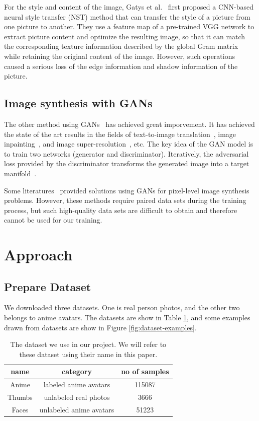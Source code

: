 \documentclass[10pt,twocolumn,letterpaper]{article}
\begin{document}
For the style and content of the image, Gatys et al.~\cite{NST} first proposed a
CNN-based neural style transfer (NST) method that can transfer the style of a
picture from one picture to another. They use a feature map of a pre-trained VGG
network to extract picture content and optimize the resulting image, so that it
can match the corresponding texture information described by the global Gram
matrix~\cite{gatys2015texture} while retaining the original content of the
image. However, such operations caused a serious loss of the edge information
and shadow information of the picture.

\subsection{Image synthesis with GANs}
The other method using GANs~\cite{GAN} has achieved great imporvement.
It has achieved the state of the art results in the fields of text-to-image
translation~\cite{reed2016generative}, image inpainting~\cite{yeh2016semantic},
and image super-resolution~\cite{ledig2017photo}, etc. The key idea of the GAN
model is to train two networks (generator and discriminator). Iteratively, the
adversarial loss provided by the discriminator transforms the generated image
into a target manifold~\cite{yeh2016semantic}.

Some literatures~\cite{dumoulin2016adversarially,isola2017image,
karacan2016learning} provided solutions using GANs for pixel-level image
synthesis problems. However, these methods require paired data sets during the
training process, but such high-quality data sets are difficult to obtain and
therefore cannot be used for our training.

\section{Approach}

\subsection{Prepare Dataset}

We downloaded three datasets. One is real person photos, and the other two
belongs to anime avatars. The datasets are show in Table \ref{tab:datasets}, and
some examples drawn from datasets are show in Figure \ref{fig:dataset-examples}.

\begin{table}[h]
   \centering
   \begin{tabular}{|c|c|c|}
   \hline
   name & category & no of samples \\ \hline
   Anime & labeled anime avatars & 115087 \\ \hline
   Thumbs & unlabeled real photos & 3666 \\ \hline
   Faces & unlabeled anime avatars & 51223 \\ \hline
   \end{tabular}
   \caption{The dataset we use in our project. We will refer to these dataset
   using their name in this paper.}
   \label{tab:datasets}
\end{table}
\end{document}
